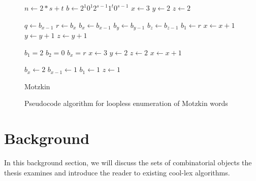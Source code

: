 \begin{figure}
    \centering
        \begin{algorithm}[H]
        \begin{algorithmic}
        \EndFunction{}
         
        \State $n \gets 2*s+t$
        \State $b \gets 2^1 0^1 2^{s-1} 1^t 0^{s-1}$
        \State $x \gets 3$
        \State $y \gets 2$
        \State $z \gets 2$
        
        \State {}
        
            \State $q \gets b_{x-1}$
            \State $r \gets b_x$
            \vspace{.4em} 
            \State $b_x\gets b_{x-1}$
            \State $b_y\gets b_{y-1}$
            \State $b_z\gets b_{z-1}$
            \State $b_1\gets r$
            \vspace{.4em} 
            \State $x \gets x+1$
            \State $y \gets y+1$
            \State $z \gets y+1$
            
            \vspace{.4em} 
                    \State $b_1=2$
                    \State $b_2=0$
                    \State $b_x=r$
                    \State $x \gets 3$
                    \State $y \gets 2$
                    \State $z \gets 2$
                \Else 
                    \State $x \gets x+1$
                
                \EndIf
                    \State $b_x \gets 2$     
                    \State $b_{x-1} \gets 1$     
                    \State $b_1 \gets 1$     
                    \State $z \gets 1$     
                
                \EndIf
            \EndIf
        \EndWhile
        \end{algorithmic}
        \caption{Motzkin}
        \end{algorithm}
    \caption{Pseudocode algorithm for loopless enumeration of Motzkin words}
    \label{motzkinAlg}
\end{figure}


\section{Background}
In this background section, we will discuss the sets of combinatorial objects the thesis examines and introduce the reader to existing cool-lex algorithms.


